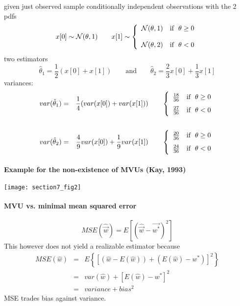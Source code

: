 given just observed sample conditionally independent observations with the 2 pdfs
$$
x[0] \sim \mathcal{N}(\theta,1) \qquad
x[1] \sim
\left\{
\begin{array}{c}
  \mathcal{N}(\theta,1) \quad \rm if \hspace{0.2cm} \theta \geq 0 \\\\
  \mathcal{N}(\theta,2) \quad \rm if \hspace{0.2cm}  \theta < 0 
\end{array} 
\right.
$$ 
two estimators
$$
\hat{\theta}_1 = \frac{1}{2}(x[0]+x[1]) \qquad \text{and} \qquad
\hat{\theta}_2 = \frac{2}{3} x[0] + \frac{1}{3} x[1]
$$
variances: 
\begin{eqnarray*}
var(\hat{\theta}_1) & = & \frac{1}{4}(var(x[0])+var(x[1])) \qquad
\left\{
\begin{array}{c}
  \frac{18}{36} \quad \rm if \hspace{0.2cm} \theta \geq 0 \\[0.7em]
  \frac{27}{36} \quad \rm if \hspace{0.2cm} \theta < 0 
\end{array} 
\right. \\\\
var(\hat{\theta}_2) & = & \frac{4}{9} var(x[0]) + \frac{1}{9} var(x[1]) \qquad
\left\{
\begin{array}{c}
  \frac{20}{36} \quad \rm if \hspace{0.2cm} \theta \geq 0 \\[0.7em]
  \frac{24}{36} \quad \rm if \hspace{0.2cm} \theta < 0 
\end{array} 
\right.
\end{eqnarray*}
\vspace{3mm}

\paragraph{Example for the non-existence of MVUs (Kay, 1993)}
\begin{center}
\texttt{[image: section7\_fig2]}
\end{center}

\paragraph{MVU vs. minimal mean squared error}
$$MSE(\hat{\vec{w}}) = E[(\hat{\vec{w}}-\vec{w^*})^2]$$
\vspace{0.5cm}
This however does not yield a realizable estimator because
\begin{eqnarray*}
MSE(\hat{w}) & = & E\left\{[(\hat{w} - E(\hat{w}) ) +(E(\hat{w})-w^*) ]^2\right\}\\
 & = & var(\hat{w}) + [ E(\hat{w}) -w^* ]^2\\
 & = & variance + bias^2
\end{eqnarray*}
MSE trades bias against variance.
 
